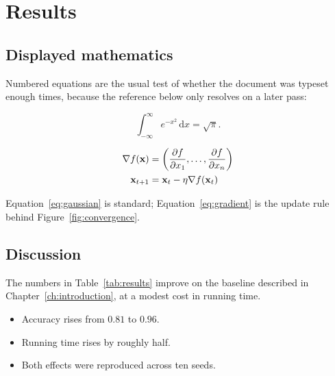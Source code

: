 \chapter{Results}
\label{ch:results}

\section{Displayed mathematics}
\label{sec:maths}

Numbered equations are the usual test of whether the document was typeset
enough times, because the reference below only resolves on a later pass:

\begin{equation}
    \label{eq:gaussian}
    \int_{-\infty}^{\infty} e^{-x^{2}} \, \mathrm{d}x = \sqrt{\pi}.
\end{equation}

\begin{align}
    \label{eq:gradient}
    \nabla f(\mathbf{x}) &= \left( \frac{\partial f}{\partial x_{1}},
                                 \dots,
                                 \frac{\partial f}{\partial x_{n}} \right) \\
    \mathbf{x}_{t+1}     &= \mathbf{x}_{t} - \eta \nabla f(\mathbf{x}_{t})
\end{align}

Equation~\eqref{eq:gaussian} is standard; Equation~\eqref{eq:gradient} is the
update rule behind Figure~\ref{fig:convergence}.

\section{Discussion}

The numbers in Table~\ref{tab:results} improve on the baseline described in
Chapter~\ref{ch:introduction}, at a modest cost in running time.

\begin{itemize}
    \item Accuracy rises from $0.81$ to $0.96$.
    \item Running time rises by roughly half.
    \item Both effects were reproduced across ten seeds.
\end{itemize}
